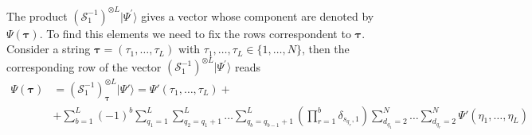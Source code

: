 \documentclass[10pt]{article}
\numberwithin{equation}{section}
\numberwithin{equation}{subsection}
\begin{document}

		The product $\left(\mathcal{S}_{1}^{-1}\right)^{\otimes L}|\Psi^{'}\rangle$ gives a vector whose component are denoted by $\Psi(\bm{\tau})$. 
		To find this elements we need to fix the rows correspondent to $\bm{\tau}$. Consider a string $\bm{\tau}=(\tau_{1},\ldots,\tau_{L})$ with $\tau_{1},\ldots,\tau_{L}\in \{1,\ldots,N\}$, then the corresponding row of the vector $\left(\mathcal{S}_{1}^{-1}\right)^{\otimes L}|\Psi^{'}\rangle$ reads
		\begin{equation}
			\begin{split}
				\Psi(\bm{\tau}) &=\left(\mathcal{S}_{1}^{-1}\right)^{\otimes L}_{\bm{\tau}}|\Psi{'}\rangle=\Psi{'}(\tau_{1},\ldots,\tau_{L})+ 
				\\&
				+\sum_{b=1}^{L}(-1)^{b}\sum_{q_{1}=1}^{L}\sum_{q_{2}=q_{1}+1}^{L}\ldots\sum_{q_{b}=q_{b-1}+1}^{L}\left(\prod_{r=1}^{b}\delta_{s_{q_{r}},1}\right)\sum_{d_{q_{1}}=2}^{N}\ldots\sum_{d_{q_{r}}=2}^{N}\Psi{'}(\eta_{1},\ldots,\eta_{L})
			\end{split}
		\end{equation}
\end{document}
